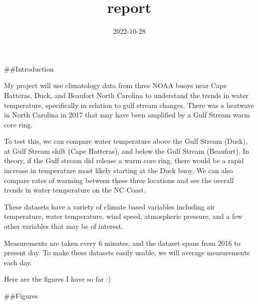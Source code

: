 \documentclass[
]{article}
\title{report}
\author{}
\date{\vspace{-2.5em}2022-10-28}
\begin{document}
\maketitle

\#\#Introduction

My project will use climatology data from three NOAA buoys near Cape
Hatteras, Duck, and Beaufort North Carolina to understand the trends in
water temperature, specifically in relation to gulf stream changes.
There was a heatwave in North Carolina in 2017 that may have been
amplified by a Gulf Stream warm core ring.

To test this, we can compare water temperature above the Gulf Stream
(Duck), at Gulf Stream shift (Cape Hatteras), and below the Gulf Stream
(Beaufort). In theory, if the Gulf stream did release a warm core ring,
there would be a rapid increase in temperature most likely starting at
the Duck buoy. We can also compare rates of warming between these three
locations and see the overall trends in water temperature on the NC
Coast.

These datasets have a variety of climate based variables including air
temperature, water temperature, wind speed, atmospheric pressure, and a
few other variables that may be of interest.

Measurements are taken every 6 minutes, and the dataset spans from 2016
to present day. To make these datasets easily usable, we will average
measurements each day.

Here are the figures I have so far :)

\#\#Figures
\end{document}
